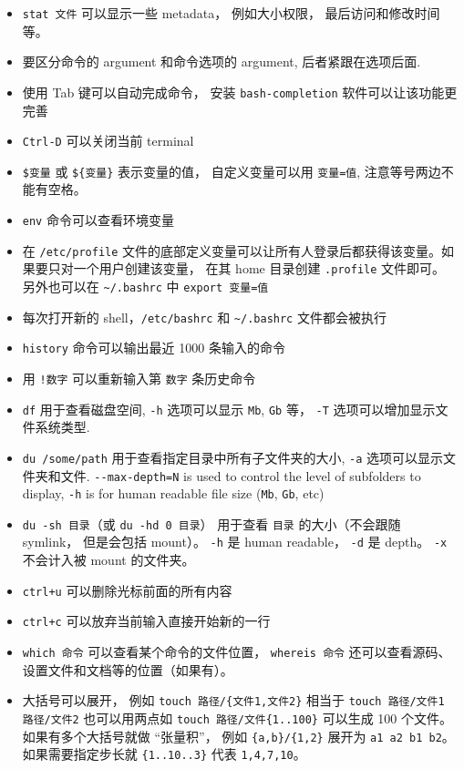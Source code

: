 \begin{itemize}
\item \verb|stat 文件| 可以显示一些 metadata， 例如大小权限， 最后访问和修改时间等。
\item 要区分命令的 argument 和命令选项的 argument, 后者紧跟在选项后面.
\item 使用 Tab 键可以自动完成命令， 安装 \verb|bash-completion| 软件可以让该功能更完善
\item \verb`Ctrl-D` 可以关闭当前 terminal
\item \verb`$变量` 或 \verb|${变量}| 表示变量的值， 自定义变量可以用 \verb`变量=值`, 注意等号两边不能有空格。
\item \verb`env` 命令可以查看环境变量
\item 在 \verb`/etc/profile` 文件的底部定义变量可以让所有人登录后都获得该变量。如果要只对一个用户创建该变量， 在其 home 目录创建 \verb|.profile| 文件即可。 另外也可以在 \verb|~/.bashrc| 中 \verb|export 变量=值|
\item 每次打开新的 shell，\verb`/etc/bashrc` 和 \verb`~/.bashrc` 文件都会被执行
\item \verb|history| 命令可以输出最近 1000 条输入的命令
\item 用 \verb`!数字` 可以重新输入第 \verb`数字` 条历史命令
\item \verb`df` 用于查看磁盘空间, \verb`-h` 选项可以显示 \verb`Mb`, \verb`Gb` 等， \verb|-T| 选项可以增加显示文件系统类型.
\item \verb`du /some/path` 用于查看指定目录中所有子文件夹的大小, \verb`-a` 选项可以显示文件夹和文件. \verb`--max-depth=N` is used to control the level of subfolders to display, \verb`-h` is for human readable file size (\verb`Mb`, \verb`Gb`, etc)
\item \verb|du -sh 目录|（或 \verb|du -hd 0 目录|） 用于查看 \verb|目录| 的大小（不会跟随 symlink， 但是会包括 mount）。 \verb|-h| 是 human readable， \verb|-d| 是 depth。 \verb|-x| 不会计入被 mount 的文件夹。
\item \verb`ctrl+u` 可以删除光标前面的所有内容
\item \verb`ctrl+c` 可以放弃当前输入直接开始新的一行
\item \verb|which 命令| 可以查看某个命令的文件位置， \verb|whereis 命令| 还可以查看源码、设置文件和文档等的位置（如果有）。
\item 大括号可以展开， 例如 \verb|touch 路径/{文件1,文件2}| 相当于 \verb|touch 路径/文件1 路径/文件2| 也可以用两点如 \verb|touch 路径/文件{1..100}| 可以生成 100 个文件。 如果有多个大括号就做 “张量积”， 例如 \verb|{a,b}/{1,2}| 展开为 \verb|a1 a2 b1 b2|。 如果需要指定步长就 \verb|{1..10..3}| 代表 \verb|1,4,7,10|。
\end{itemize}

